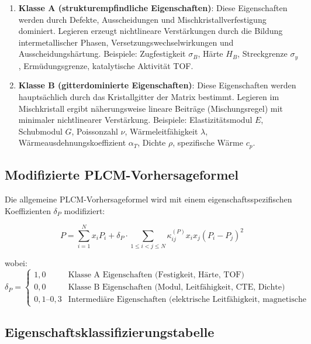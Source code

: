 \documentclass[12pt,a4paper]{article}
\begin{document}
\begin{enumerate}
	\item \textbf{Klasse A (strukturempfindliche Eigenschaften)}: Diese Eigenschaften werden durch Defekte, Ausscheidungen und Mischkristallverfestigung dominiert. Legieren erzeugt nichtlineare Verstärkungen durch die Bildung intermetallischer Phasen, Versetzungswechselwirkungen und Ausscheidungshärtung. Beispiele: Zugfestigkeit \(\sigma_B\), Härte \(H_B\), Streckgrenze \(\sigma_y\), Ermüdungsgrenze, katalytische Aktivität TOF.
	
	\item \textbf{Klasse B (gitterdominierte Eigenschaften)}: Diese Eigenschaften werden hauptsächlich durch das Kristallgitter der Matrix bestimmt. Legieren im Mischkristall ergibt näherungsweise lineare Beiträge (Mischungsregel) mit minimaler nichtlinearer Verstärkung. Beispiele: Elastizitätsmodul \(E\), Schubmodul \(G\), Poissonzahl \(\nu\), Wärmeleitfähigkeit \(\lambda\), Wärmeausdehnungskoeffizient \(\alpha_T\), Dichte \(\rho\), spezifische Wärme \(c_p\).
\end{enumerate}

\subsection{Modifizierte PLCM-Vorhersageformel}

Die allgemeine PLCM-Vorhersageformel wird mit einem eigenschaftsspezifischen Koeffizienten \(\delta_P\) modifiziert:

\begin{equation}
	\boxed{P = \sum_{i=1}^{N} x_i P_i + \delta_P \cdot \sum_{1\le i<j\le N} \kappa_{ij}^{(P)} x_i x_j (P_i - P_j)^2}
	\label{eq:plcm-modified}
\end{equation}

wobei:
\[
\delta_P = \begin{cases}
	1,0 & \text{Klasse A Eigenschaften (Festigkeit, Härte, TOF)} \\
	0,0 & \text{Klasse B Eigenschaften (Modul, Leitfähigkeit, CTE, Dichte)} \\
	0,1\text{--}0,3 & \text{Intermediäre Eigenschaften (elektrische Leitfähigkeit, magnetische Suszeptibilität)}
\end{cases}
\]

\subsection{Eigenschaftsklassifizierungstabelle}
\end{document}
